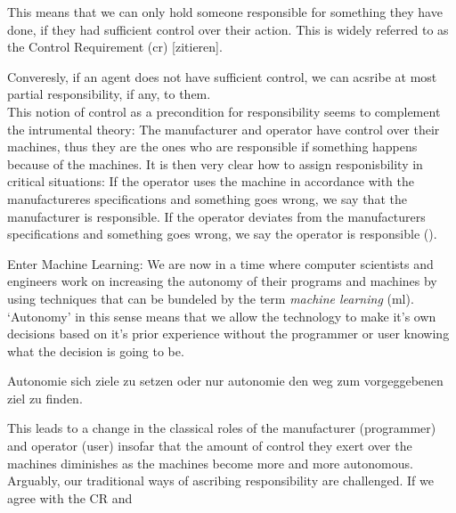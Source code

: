 \documentclass{article}
\begin{document}
\vspace{.8em}
This means that we can only hold someone responsible for something they have
done, if they had sufficient control over their action.
This is widely referred to as the Control Requirement (\acrshort{cr}) [zitieren].

Converesly, if an agent does not have sufficient control, we can acsribe at most
partial responsibility, if any, to them.\\ 

This notion of control as a
precondition for responsibility seems to complement the intrumental theory: The
manufacturer and operator have control over their machines, thus they are the
ones who are responsible if something happens because of the machines.  It is
then very clear how to assign responisbility in critical situations: If the
operator uses the machine in accordance with the manufactureres specifications
and something goes wrong, we say that the manufacturer is responsible. If the
operator deviates from the manufacturers specifications and something goes
wrong, we say the operator is responsible (\cite[p.175]{Matthias_2004}).

Enter Machine Learning:
We are now in a time where computer scientists and engineers work on increasing
the autonomy of their programs and machines by using techniques that can be
bundeled by the term \textit{machine learning} (\acrshort{ml}). `Autonomy' in this sense
means that we allow the technology to make it's own decisions based on it's
prior experience without the programmer or user knowing what the decision is
going to be. 

Autonomie sich ziele zu setzen oder nur autonomie den weg zum vorgeggebenen ziel
zu finden. 


This leads to a change in the classical roles of the manufacturer
(programmer) and operator (user) insofar that the amount of control they exert
over the machines diminishes as the machines become more and more autonomous.
Arguably, our traditional ways of ascribing responsibility are challenged. If we
agree with the CR and 

\end{document}
